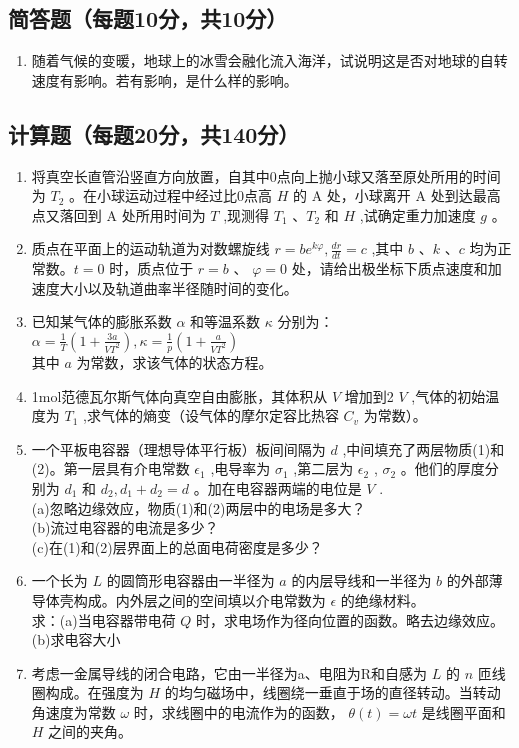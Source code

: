 
\subsection{简答题（每题10分，共10分）}
\begin{enumerate}
\item 随着气候的变暖，地球上的冰雪会融化流入海洋，试说明这是否对地球的自转速度有影响。若有影响，是什么样的影响。
\end{enumerate}
\subsection{计算题（每题20分，共140分）}
\begin{enumerate}
\item 将真空长直管沿竖直方向放置，自其中0点向上抛小球又落至原处所用的时间为 $T_2$ 。在小球运动过程中经过比0点高 $H$ 的 $\mathrm A$ 处，小球离开 $\mathrm A$ 处到达最高点又落回到 $\mathrm A$ 处所用时间为 $T$ ,现测得 $T_1$ 、$T_2$ 和 $H$ ,试确定重力加速度 $g$ 。
\item 质点在平面上的运动轨道为对数螺旋线 $r=be^{k\varphi},\frac{dr}{dt}=c$ ,其中 $b$ 、$k$ 、$c$ 均为正常数。$t=0$ 时，质点位于 $r=b$ 、 $\varphi=0$ 处，请给出极坐标下质点速度和加速度大小以及轨道曲率半径随时间的变化。
\item 已知某气体的膨胀系数 $\alpha$ 和等温系数 $\kappa$ 分别为：\\
 $\alpha=\frac{1}{T}(1+\frac{3a}{VT^2}),\kappa=\frac{1}{p}(1+\frac{a}{VT^2})$ \\
其中 $a$ 为常数，求该气体的状态方程。

\item 1mol范德瓦尔斯气体向真空自由膨胀，其体积从 $V$ 增加到2 $V$ ,气体的初始温度为 $T_1$ ,求气体的熵变（设气体的摩尔定容比热容 $C_v$ 为常数）。
\item 一个平板电容器（理想导体平行板）板间间隔为 $d$ ,中间填充了两层物质(1)和(2)。第一层具有介电常数 $\epsilon_1$ ,电导率为 $\sigma_1$ ,第二层为 $\epsilon_2$ , $\sigma_2$ 。他们的厚度分别为 $d_1$ 和 $d_2,d_1+d_2=d$ 。加在电容器两端的电位是 $V$ .\\
(a)忽略边缘效应，物质(1)和(2)两层中的电场是多大？\\
(b)流过电容器的电流是多少？\\
(c)在(1)和(2)层界面上的总面电荷密度是多少？\\
\item 一个长为 $L$ 的圆筒形电容器由一半径为 $a$ 的内层导线和一半径为 $b$ 的外部薄导体壳构成。内外层之间的空间填以介电常数为 $\epsilon$ 的绝缘材料。\\
求：(a)当电容器带电荷 $Q$ 时，求电场作为径向位置的函数。略去边缘效应。\\
(b)求电容大小
\item 考虑一金属导线的闭合电路，它由一半径为a、电阻为R和自感为 $L$ 的 $n$ 匝线圈构成。在强度为 $H$ 的均匀磁场中，线圈绕一垂直于场的直径转动。当转动角速度为常数 $\omega$ 时，求线圈中的电流作为的函数， $\theta (t)=\omega t$ 是线圈平面和 $H$ 之间的夹角。

\end{enumerate}
